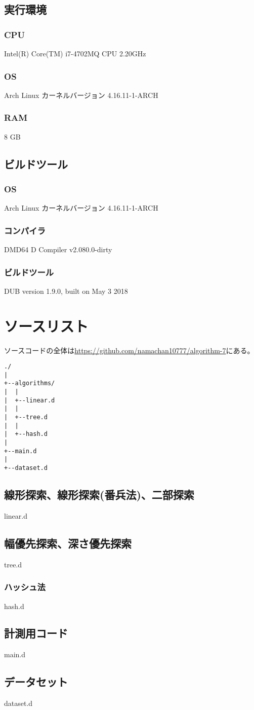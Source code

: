 \documentclass[dvipdfmx]{jsarticle}
\begin{document}
		\subsection{実行環境}
			\subsubsection{CPU}
				Intel(R) Core(TM) i7-4702MQ CPU 2.20GHz
			\subsubsection{OS}
				Arch Linux
				カーネルバージョン 4.16.11-1-ARCH
			\subsubsection{RAM}
				8 GB
		\subsection{ビルドツール}
			\subsubsection{OS}
				Arch Linux
				カーネルバージョン 4.16.11-1-ARCH
			\subsubsection{コンパイラ}
				DMD64 D Compiler v2.080.0-dirty
			\subsubsection{ビルドツール}
				DUB version 1.9.0, built on May  3 2018
	\section{ソースリスト}
		ソースコードの全体は\url{https://github.com/namachan10777/algorithm-7}にある。
		\begin{verbatim}
./
|
+--algorithms/
|  |
|  +--linear.d
|  |
|  +--tree.d
|  |
|  +--hash.d
|
+--main.d
|
+--dataset.d
		\end{verbatim}
		\subsection{線形探索、線形探索(番兵法)、二部探索}
			linear.d
			\newpage
		\subsection{幅優先探索、深さ優先探索}
			tree.d
			\newpage
		\subsubsection{ハッシュ法}
			hash.d
			\newpage
		\subsection{計測用コード}
			main.d
			\newpage
		\subsection{データセット}
			dataset.d
			\newpage
\end{document}
